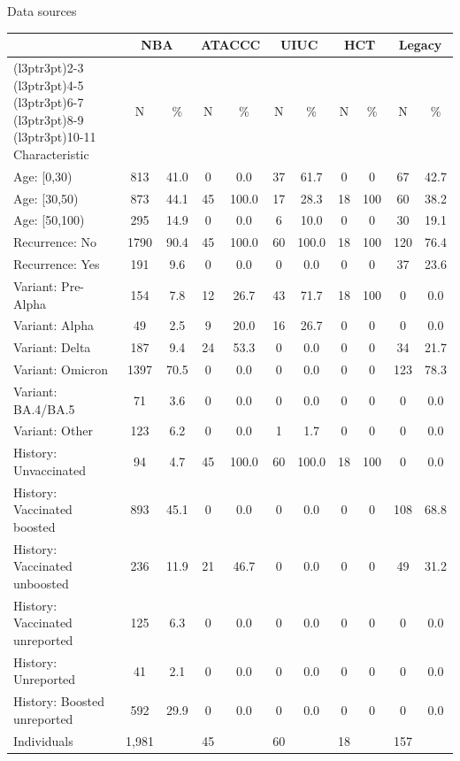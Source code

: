 \documentclass[9pt, aspectratio=169]{beamer}
\begin{document}
\begin{frame}{Data sources}
\begin{table}
\centering
\small
\begin{tabular}{lcccccccccc}
\toprule
\multicolumn{1}{c}{ } & \multicolumn{2}{c}{NBA} & \multicolumn{2}{c}{ATACCC} & \multicolumn{2}{c}{UIUC} & \multicolumn{2}{c}{HCT} & \multicolumn{2}{c}{Legacy} \\
\cmidrule(l{3pt}r{3pt}){2-3} \cmidrule(l{3pt}r{3pt}){4-5} \cmidrule(l{3pt}r{3pt}){6-7} \cmidrule(l{3pt}r{3pt}){8-9} \cmidrule(l{3pt}r{3pt}){10-11}
Characteristic & N & \% & N & \% & N & \% & N & \% & N & \%\\
\midrule
Age: [0,30) & 813 & 41.0 & 0 & 0.0 & 37 & 61.7 & 0 & 0 & 67 & 42.7\\
Age: [30,50) & 873 & 44.1 & 45 & 100.0 & 17 & 28.3 & 18 & 100 & 60 & 38.2\\
Age: [50,100) & 295 & 14.9 & 0 & 0.0 & 6 & 10.0 & 0 & 0 & 30 & 19.1\\
Recurrence: No & 1790 & 90.4 & 45 & 100.0 & 60 & 100.0 & 18 & 100 & 120 & 76.4\\
Recurrence: Yes & 191 & 9.6 & 0 & 0.0 & 0 & 0.0 & 0 & 0 & 37 & 23.6\\
Variant: Pre-Alpha & 154 & 7.8 & 12 & 26.7 & 43 & 71.7 & 18 & 100 & 0 & 0.0\\
Variant: Alpha & 49 & 2.5 & 9 & 20.0 & 16 & 26.7 & 0 & 0 & 0 & 0.0\\
Variant: Delta & 187 & 9.4 & 24 & 53.3 & 0 & 0.0 & 0 & 0 & 34 & 21.7\\
Variant: Omicron & 1397 & 70.5 & 0 & 0.0 & 0 & 0.0 & 0 & 0 & 123 & 78.3\\
Variant: BA.4/BA.5 & 71 & 3.6 & 0 & 0.0 & 0 & 0.0 & 0 & 0 & 0 & 0.0\\
Variant: Other & 123 & 6.2 & 0 & 0.0 & 1 & 1.7 & 0 & 0 & 0 & 0.0\\
History: Unvaccinated & 94 & 4.7 & 45 & 100.0 & 60 & 100.0 & 18 & 100 & 0 & 0.0\\
History: Vaccinated boosted & 893 & 45.1 & 0 & 0.0 & 0 & 0.0 & 0 & 0 & 108 & 68.8\\
History: Vaccinated unboosted & 236 & 11.9 & 21 & 46.7 & 0 & 0.0 & 0 & 0 & 49 & 31.2\\
History: Vaccinated unreported & 125 & 6.3 & 0 & 0.0 & 0 & 0.0 & 0 & 0 & 0 & 0.0\\
History: Unreported & 41 & 2.1 & 0 & 0.0 & 0 & 0.0 & 0 & 0 & 0 & 0.0\\
History: Boosted unreported & 592 & 29.9 & 0 & 0.0 & 0 & 0.0 & 0 & 0 & 0 & 0.0\\
\midrule
Individuals & 1,981 &  & 45 & & 60 & & 18 & & 157 & \\
\bottomrule
\end{tabular}
\end{table}
\end{frame}
\end{document}
